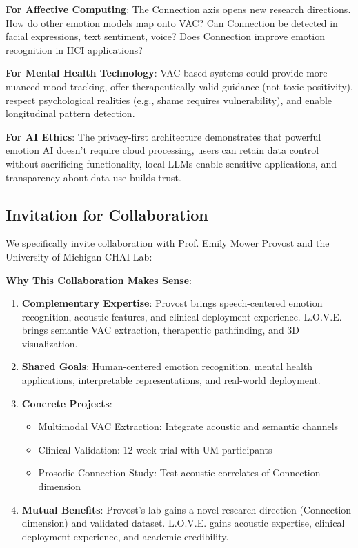 \documentclass[10pt,twocolumn]{article}
\begin{document}
\textbf{For Affective Computing}: The Connection axis opens new research directions. How do other emotion models map onto VAC? Can Connection be detected in facial expressions, text sentiment, voice? Does Connection improve emotion recognition in HCI applications?

\textbf{For Mental Health Technology}: VAC-based systems could provide more nuanced mood tracking, offer therapeutically valid guidance (not toxic positivity), respect psychological realities (e.g., shame requires vulnerability), and enable longitudinal pattern detection.

\textbf{For AI Ethics}: The privacy-first architecture demonstrates that powerful emotion AI doesn't require cloud processing, users can retain data control without sacrificing functionality, local LLMs enable sensitive applications, and transparency about data use builds trust.

\subsection{Invitation for Collaboration}

We specifically invite collaboration with Prof. Emily Mower Provost and the University of Michigan CHAI Lab:

\textbf{Why This Collaboration Makes Sense}:

\begin{enumerate}
    \item \textbf{Complementary Expertise}: Provost brings speech-centered emotion recognition, acoustic features, and clinical deployment experience. L.O.V.E. brings semantic VAC extraction, therapeutic pathfinding, and 3D visualization.

    \item \textbf{Shared Goals}: Human-centered emotion recognition, mental health applications, interpretable representations, and real-world deployment.

    \item \textbf{Concrete Projects}:
    \begin{itemize}
        \item Multimodal VAC Extraction: Integrate acoustic and semantic channels
        \item Clinical Validation: 12-week trial with UM participants
        \item Prosodic Connection Study: Test acoustic correlates of Connection dimension
    \end{itemize}

    \item \textbf{Mutual Benefits}: Provost's lab gains a novel research direction (Connection dimension) and validated dataset. L.O.V.E. gains acoustic expertise, clinical deployment experience, and academic credibility.
\end{enumerate}
\end{document}
